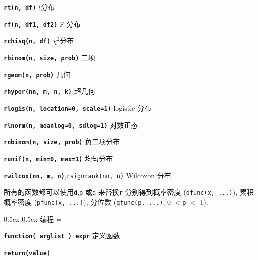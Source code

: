 \documentclass[landscape]{article}
\makeatletter
\renewcommand\section{\@startsection{section}{1}{0mm}%
                                     {0.5ex}%
                                     {0.5ex}%
                                {\color{black}\normalfont\large\bfseries}}
\newcommand{\code}{\texttt}
\newcommand{\bcode}[1]{\texttt{\textbf{#1}}}
\makeatother
\begin{document}
\begin{multicols*}{3}
\bcode{rt(n, df)} $t$分布

\bcode{rf(n, df1, df2)} F 分布

\bcode{rchisq(n, df)} $\chi^2$分布

\bcode{rbinom(n, size, prob)} 二项

\bcode{rgeom(n, prob)} 几何

\bcode{rhyper(nn, m, n, k)} 超几何

\bcode{rlogis(n, location=0, scale=1)} logistic 分布

\bcode{rlnorm(n, meanlog=0, sdlog=1)} 对数正态

\bcode{rnbinom(n, size, prob)} 负二项分布

\bcode{runif(n, min=0, max=1)} 均匀分布

\bcode{rwilcox(nn, m, n)},\code{rsignrank(nn, n)} Wilcoxon 分布

所有的函数都可以使用\code{d},\code{p} 或\code{q} 来替换\code{r}
分别得到概率密度 (\code{dfunc(x, ...)}), 累积概率密度
 (\code{pfunc(x, ...)}), 分位数 (\code{qfunc(p, ...)},
 0 $<$\code{p} $<$ 1).



\section{编程}
\everypar={\hangindent=9mm}

\bcode{function( arglist ) expr} 定义函数

\bcode{return(value)}


\end{multicols*}
\end{document}
